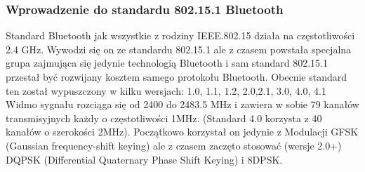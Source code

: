 \subsubsection{Wprowadzenie do standardu 802.15.1 Bluetooth}

\par
\tab Standard Bluetooth jak wszystkie z rodziny IEEE.802.15 działa na częstotliwości 2.4 GHz. Wywodzi się on ze standardu 802.15.1 ale z czasem powstała specjalna grupa zajmująca się jedynie technologią Bluetooth i sam standard 802.15.1 przestał być rozwijany kosztem samego protokołu Bluetooth. Obecnie standard ten został wypuszczony w kilku wersjach: 1.0, 1.1, 1.2, 2.0,2.1, 3.0, 4.0, 4.1\\
Widmo sygnału rozciąga się od 2400 do 2483.5 MHz i zawiera w sobie 79 kanałów transmisyjnych każdy o częstotliwości 1MHz. (Standard 4.0 korzysta z 40 kanałów o szerokości 2MHz). Początkowo korzystał on jedynie z Modulacji GFSK (Gaussian frequency-shift keying) ale z czasem zaczęto stosować (wersje 2.0+) DQPSK  (Differential Quaternary Phase Shift Keying) i 8DPSK.

\clearpage 